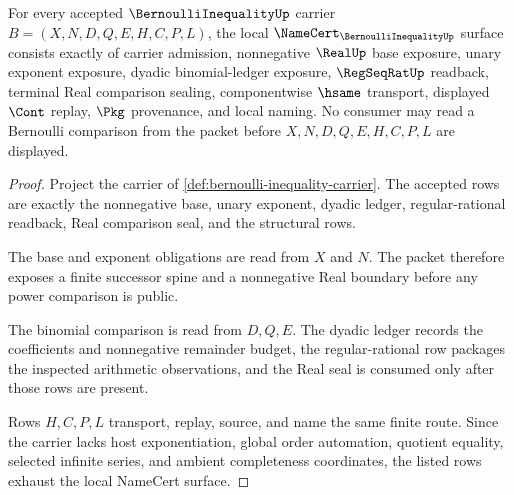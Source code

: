 \begin{theorem}\label{thm:bernoulli-inequality-namecert-obligations}
For every accepted $\BernoulliInequalityUp$ carrier $B=(X,N,D,Q,E,H,C,P,L)$, the local $\NameCert_{\BernoulliInequalityUp}$ surface consists exactly of carrier admission, nonnegative $\RealUp$ base exposure, unary exponent exposure, dyadic binomial-ledger exposure, $\RegSeqRatUp$ readback, terminal Real comparison sealing, componentwise $\hsame$ transport, displayed $\Cont$ replay, $\Pkg$ provenance, and local naming. No consumer may read a Bernoulli comparison from the packet before $X,N,D,Q,E,H,C,P,L$ are displayed.
\end{theorem}
\begin{proof}
Project the carrier of \autoref{def:bernoulli-inequality-carrier}. The accepted rows are exactly the nonnegative base, unary exponent, dyadic ledger, regular-rational readback, Real comparison seal, and the structural rows.

The base and exponent obligations are read from $X$ and $N$. The packet therefore exposes a finite successor spine and a nonnegative Real boundary before any power comparison is public.

The binomial comparison is read from $D,Q,E$. The dyadic ledger records the coefficients and nonnegative remainder budget, the regular-rational row packages the inspected arithmetic observations, and the Real seal is consumed only after those rows are present.

Rows $H,C,P,L$ transport, replay, source, and name the same finite route. Since the carrier lacks host exponentiation, global order automation, quotient equality, selected infinite series, and ambient completeness coordinates, the listed rows exhaust the local NameCert surface.
\end{proof}

